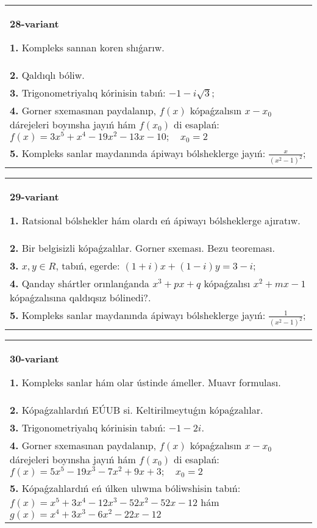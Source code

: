 \documentclass{article}
\begin{document}
\begin{tabular}{m{17cm}}
\textbf{28-variant}
\newline

\textbf{1.} Kompleks sannan koren shıǵarıw. \\
\textbf{2.} Qaldıqlı bóliw.  \\
\textbf{3.} Trigonometriyalıq kórinisin tabıń: $-1-i \sqrt{3}$; \\
\textbf{4.} Gorner sxemasınan paydalanıp, $f(x)$ kópaǵzalısın $x-x_0$ dárejeleri boyınsha jayıń hám $f\left(x_0\right)$ di esaplań: $f(x)=3 x^5+x^4-19 x^2-13 x-10 ; \quad x_0=2$ \\
\textbf{5.} Kompleks sanlar maydanında ápiwayı bólsheklerge jayıń: $\frac{x}{\left(x^2-1\right)^2}$; \\

\end{tabular}
\vspace{1cm}


\begin{tabular}{m{17cm}}
\textbf{29-variant}
\newline

\textbf{1.} Ratsional bólshekler hám olardı eń ápiwayı bólsheklerge ajıratıw. \\
\textbf{2.} Bir belgisizli kópaǵzalılar. Gorner sxeması. Bezu teoreması.  \\
\textbf{3.}  $x, y \in R$, tabıń, egerde:  $(1+i) x+(1-i) y=3-i$; \\
\textbf{4.} Qanday shártler orınlanǵanda $x^3+p x+q$ kópaǵzalısı $x^2+m x-1$ kópaǵzalısına qaldıqsız bólinedi?. \\
\textbf{5.} Kompleks sanlar maydanında ápiwayı bólsheklerge jayıń: $\frac{1}{\left(x^2-1\right)^2}$; \\

\end{tabular}
\vspace{1cm}


\begin{tabular}{m{17cm}}
\textbf{30-variant}
\newline

\textbf{1.} Kompleks sanlar hám olar ústinde ámeller. Muavr formulası.  \\
\textbf{2.} Kópaǵzalılardıń EÚUB si. Keltirilmeytuǵın   kópaǵzalılar. \\
\textbf{3.} Trigonometriyalıq kórinisin tabıń: $-1-2 i$. \\
\textbf{4.} Gorner sxemasınan paydalanıp, $f(x)$ kópaǵzalısın $x-x_0$ dárejeleri boyınsha jayıń hám $f\left(x_0\right)$ di esaplań: $f(x)=5 x^5-19 x^3-7 x^2+9 x+3 ; \quad x_0=2$ \\
\textbf{5.} Kópaǵzalılardıń eń úlken ulıwma bóliwshisin tabıń:  $f(x)=x^5+3 x^4-12 x^3-52 x^2-52 x-12$ hám $g(x)=x^4+3 x^3-6 x^2-22 x-12$ \\

\end{tabular}
\vspace{1cm}
\end{document}
